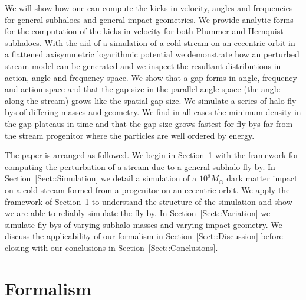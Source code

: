\documentclass[useAMS,usenatbib,fleqn,a4paper]{mn2e}
\begin{document}
We will show how one can compute the kicks in velocity, angles and frequencies for general subhaloes and general impact geometries. We provide analytic forms for the computation of the kicks in velocity for both Plummer and Hernquist subhaloes. With the aid of a simulation of a cold stream on an eccentric orbit in a flattened axisymmetric logarithmic potential we demonstrate how an perturbed stream model can be generated and we inspect the resultant distributions in action, angle and frequency space. We show that a gap forms in angle, frequency and action space and that the gap size in the parallel angle space (the angle along the stream) grows like the spatial gap size. We simulate a series of halo fly-bys of differing masses and geometry. We find in all cases the minimum density in the gap plateaus in time and that the gap size grows fastest for fly-bys far from the stream progenitor where the particles are well ordered by energy.

The paper is arranged as followed. We begin in Section~\ref{Sect::Formalism} with the framework for computing the perturbation of a stream due to a general subhalo fly-by. In Section~\ref{Sect::Simulation} we detail a simulation of a $10^8M_\odot$ dark matter impact on a cold stream formed from a progenitor on an eccentric orbit. We apply the framework of Section~\ref{Sect::Formalism} to understand the structure of the simulation and show we are able to reliably simulate the fly-by. In Section~\ref{Sect::Variation} we simulate fly-bys of varying subhalo masses and varying impact geometry. We discuss the applicability of our formalism in Section~\ref{Sect::Discussion} before closing with our conclusions in Section~\ref{Sect::Conclusions}.

\section{Formalism}\label{Sect::Formalism}
\end{document}
